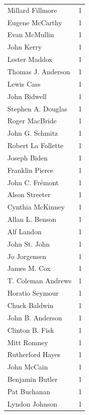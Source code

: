 \documentclass[
  letterpaper,
  DIV=11,
  numbers=noendperiod]{scrreprt}
\begin{document}
\begin{tabular}{lr}
Millard Fillmore       &          1 \\
Eugene McCarthy        &          1 \\
Evan McMullin          &          1 \\
John Kerry             &          1 \\
Lester Maddox          &          1 \\
Thomas J. Anderson     &          1 \\
Lewis Cass             &          1 \\
John Bidwell           &          1 \\
Stephen A. Douglas     &          1 \\
Roger MacBride         &          1 \\
John G. Schmitz        &          1 \\
Robert La Follette     &          1 \\
Joseph Biden           &          1 \\
Franklin Pierce        &          1 \\
John C. Frémont        &          1 \\
Alson Streeter         &          1 \\
Cynthia McKinney       &          1 \\
Allan L. Benson        &          1 \\
Alf Landon             &          1 \\
John St. John          &          1 \\
Jo Jorgensen           &          1 \\
James M. Cox           &          1 \\
T. Coleman Andrews     &          1 \\
Horatio Seymour        &          1 \\
Chuck Baldwin          &          1 \\
John B. Anderson       &          1 \\
Clinton B. Fisk        &          1 \\
Mitt Romney            &          1 \\
Rutherford Hayes       &          1 \\
John McCain            &          1 \\
Benjamin Butler        &          1 \\
Pat Buchanan           &          1 \\
Lyndon Johnson         &          1 \\

\end{tabular}
\end{document}
